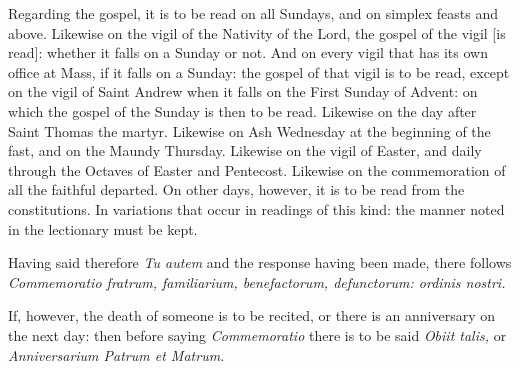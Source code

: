 \documentclass[openany]{book}
\renewcommand{\\}{\par\hspace*{.25em}} %
\renewcommand{\newline}{\par}
\begin{document}
\newline Regarding the gospel, it is to be read on all Sundays, and on simplex feasts and above. Likewise on the vigil of the Nativity of the Lord, the gospel of the vigil [is read]: whether it falls on a Sunday or not. And on every vigil that has its own office at Mass, if it falls on a Sunday: the gospel of that vigil is to be read, except on the vigil of Saint Andrew when it falls on the First Sunday of Advent: on which the gospel of the Sunday is then to be read. Likewise on the day after Saint Thomas the martyr. Likewise on Ash Wednesday at the beginning of the fast, and on the Maundy Thursday. Likewise on the vigil of Easter, and daily through the Octaves of Easter and Pentecost. Likewise on the commemoration of all the faithful departed. On other days, however, it is to be read from the constitutions. In variations that occur in readings of this kind: the manner noted in the lectionary must be kept.
\newline Having said therefore \emph{Tu autem} and the response having been made, there follows \emph{Commemoratio fratrum, familiarium, benefactorum, defunctorum: ordinis nostri.}
\newline If, however, the death of someone is to be recited, or there is an anniversary on the next day: then before saying \emph{Commemoratio} there is to be said \emph{Obiit talis,} or \emph{Anniversarium Patrum et Matrum.}
\end{document}

